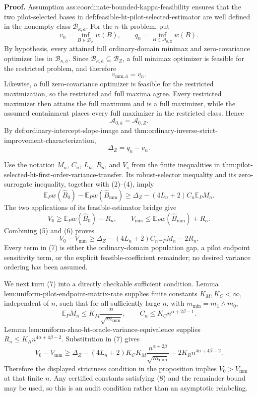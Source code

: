 \textbf{Proof.}
Assumption ass:coordinate-bounded-kappa-feasibility ensures that the two pilot-selected bases in def:feasible-ht-pilot-selected-estimator are well defined in the nonempty class \(\mathcal B_{\kappa,\overline a}\).  For the \(n\)-th problem, put
\[
 v_n=\inf_{B\in\mathcal B_Z}w(B),
 \qquad
 q_n=\inf_{B\in\mathcal A_{0,Z}}w(B).
 \tag{1}
\]
By hypothesis, every attained full ordinary-domain minimax and zero-covariance optimizer lies in \(\mathcal B_{\kappa,\overline a}\).  Since \(\mathcal B_{\kappa,\overline a}\subseteq\mathcal B_Z\), a full minimax optimizer is feasible for the restricted problem, and therefore
\[
 v_{\mathrm{mm},\overline a}=v_n.
 \tag{2}
\]
Likewise, a full zero-covariance optimizer is feasible for the restricted maximization, so the restricted and full maxima agree.  Every restricted maximizer then attains the full maximum and is a full maximizer, while the assumed containment places every full maximizer in the restricted class.  Hence
\[
 \mathcal A_{0,\overline a}=\mathcal A_{0,Z}.
 \tag{3}
\]
By def:ordinary-intercept-slope-image and thm:ordinary-inverse-strict-improvement-characterization,
\[
 \Delta_Z=q_n-v_n.
 \tag{4}
\]

Use the notation \(M_n\), \(C_n\), \(L_n\), \(R_n\), and \(V_s\) from the finite inequalities in thm:pilot-selected-ht-first-order-variance-transfer.  Its robust-selector inequality and its zero-surrogate inequality, together with (2)--(4), imply
\[
 \mathbb E_Pw(\widehat B_0)-\mathbb E_Pw(\widehat B_{\mathrm{mm}})
 \geq
 \Delta_Z-(4L_n+2)C_n\mathbb E_PM_n.
 \tag{5}
\]
The two applications of its feasible-estimator bridge give
\[
 V_0\geq\mathbb E_Pw(\widehat B_0)-R_n,
 \qquad
 V_{\mathrm{mm}}\leq\mathbb E_Pw(\widehat B_{\mathrm{mm}})+R_n.
 \tag{6}
\]
Combining (5) and (6) proves
\[
 \boxed{
 V_0-V_{\mathrm{mm}}
 \geq
 \Delta_Z-(4L_n+2)C_n\mathbb E_PM_n-2R_n.}
 \tag{7}
\]
Every term in (7) is either the ordinary-domain population gap, a pilot endpoint sensitivity term, or the explicit feasible-coefficient remainder; no desired variance ordering has been assumed.

We next turn (7) into a directly checkable sufficient condition.  Lemma lem:uniform-pilot-endpoint-matrix-rate supplies finite constants \(K_M,K_C<\infty\), independent of \(n\), such that for all sufficiently large \(n\), with \(m_{\min}=m_1\wedge m_0\),
\[
 \mathbb E_PM_n\leq K_M\frac{n}{\sqrt{m_{\min}}},
 \qquad
 C_n\leq K_Cn^{\alpha+2\beta-1}.
 \tag{8}
\]
Lemma lem:uniform-zhao-ht-oracle-variance-equivalence supplies \(R_n\leq K_Rn^{4\alpha+4\beta-2}\).  Substitution in (7) gives
\[
V_0-V_{\mathrm{mm}}
\ge
\Delta_Z
-(4L_n+2)K_CK_M\frac{n^{\alpha+2\beta}}{\sqrt{m_{\min}}}
-2K_Rn^{4\alpha+4\beta-2}.
\tag{9}
\]
Therefore the displayed strictness condition in the proposition implies \(V_0>V_{\mathrm{mm}}\) at that finite \(n\).  Any certified constants satisfying (8) and the remainder bound may be used, so this is an audit condition rather than an asymptotic relabeling.


